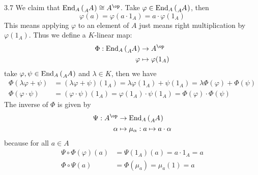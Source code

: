 \documentclass[twoside = false,	%
		headsepline,		%
		parskip = true,
		]{scrbook}						%
\begin{document}
        \begin{example}{}{3.7}
            We claim that $\End_A\round{\tensor[_A]{A}{}} \cong A^\op$. Take $\varphi \in \End_A \round{\tensor[_A]{A}{}}$, then
            \begin{equation*}
                \varphi(a) = \varphi(a \cdot 1_A) = a \cdot \varphi(1_A)
            \end{equation*}
            This means applying $\varphi$ to an element of $A$ just means right multiplication by $\varphi(1_A)$. Thus we define a $K$-linear map:
            \begin{equation*}
            \begin{split}
                \Phi: \End_A \round{\tensor[_A]{A}{}} &\to A^\op \\
                \varphi &\mapsto \varphi(1_A)
            \end{split}
            \end{equation*}
            take $\varphi,\psi \in \End_A \round{\tensor[_A]{A}{}}$ and $\lambda \in K$, then we have
            \begin{equation*}
            \begin{split}
                \Phi(\lambda \varphi + \psi) &= (\lambda \varphi + \psi)(1_A) = \lambda \varphi(1_A) + \psi(1_A) = \lambda \Phi(\varphi) + \Phi(\psi) \\
                \Phi(\varphi \cdot \psi) &= (\varphi \cdot \psi)(1_A) = \varphi(1_A) \cdot \psi(1_A) = \Phi(\varphi) \cdot \Phi(\psi)
            \end{split}
            \end{equation*}
            The inverse of $\Phi$ is given by
            \begin{equation*}
                \begin{split}
                    \Psi: A^\op &\to \End_A \round{\tensor[_A]{A}{}} \\
                            \alpha &\mapsto \mu_{\alpha}: a \mapsto a \cdot \alpha
                \end{split}
            \end{equation*}
            because for all $a \in A$
            \begin{equation*}
            \begin{split}
                \Psi \circ \Phi (\varphi)(a) &= \Psi(1_A)(a) = a \cdot 1_A = a \\
                \Phi \circ \Psi (a) &= \Phi(\mu_a) = \mu_a(1) = a
            \end{split}
            \end{equation*}
        \end{example}
\end{document}
